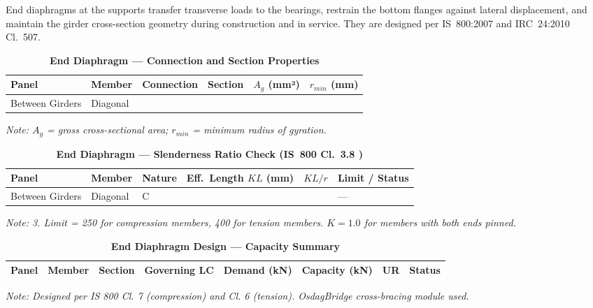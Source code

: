 \documentclass[12pt,a4paper]{report}
\numberwithin{table}{chapter}
\numberwithin{figure}{chapter}
\begin{document}
End diaphragms at the supports transfer transverse loads to the bearings, restrain the bottom flanges against lateral displacement, and maintain the girder cross-section geometry during construction and in service. They are designed per IS~800:2007 and IRC~24:2010 Cl.~507.

\vspace{1em}

\vspace{0.4em}
\noindent
\setlength{\tabcolsep}{4pt}
\setlength{\LTleft}{0pt}
\setlength{\LTright}{\fill}

\begin{longtable}{|C{2.0cm}|L{2.0cm}|L{2.2cm}|C{2.5cm}|C{2.0cm}|C{2.0cm}|}
\caption{\textbf{End Diaphragm --- Connection and Section Properties}}
\hline
\textbf{Panel} & \textbf{Member} & \textbf{Connection} & \textbf{Section} & \textbf{$A_g$ (mm²)} & \textbf{$r_{min}$ (mm)} \\[6pt]
\hline
Between Girders & Diagonal &  &  &  &  \\[6pt]
\hline
\end{longtable}
\noindent\textit{Note: $A_g$ = gross cross-sectional area; $r_{min}$ = minimum radius of gyration.}

\vspace{1em}
\begin{longtable}{|C{2.2cm}|L{2.2cm}|L{2.5cm}|C{2.5cm}|C{2.5cm}|>{\centering\arraybackslash}p{3.6cm}|}
\caption{\textbf{End Diaphragm --- Slenderness Ratio Check (IS~800 Cl.~3.8 )}}
\hline
\textbf{Panel} & \textbf{Member} & \textbf{Nature} & \textbf{Eff.\ Length $KL$ (mm)} & \textbf{$KL/r$} & \textbf{Limit / Status} \\[6pt]
\hline
Between Girders & Diagonal & C &  &  &  ---  \\[6pt]
\hline
\end{longtable}
\noindent\textit{Note:  3. Limit = 250 for compression members, 400 for tension members. $K = 1.0$ for members with both ends pinned.}

\vspace{1em}

\begin{longtable}{|C{2.0cm}|L{1.8cm}|C{2.2cm}|C{3.0cm}|C{1.8cm}|C{1.8cm}|C{1.2cm}|C{1.8cm}|}
\caption{\textbf{End Diaphragm Design --- Capacity Summary}}
\hline
\textbf{Panel} & \textbf{Member} & \textbf{Section} & \textbf{Governing LC} & \textbf{Demand (kN)} & \textbf{Capacity (kN)} & \textbf{UR} & \textbf{Status} \\[6pt]
\hline

\end{longtable}
\noindent\textit{Note: Designed per IS 800 Cl. 7 (compression) and Cl. 6 (tension). OsdagBridge cross-bracing module used.}
\end{document}
